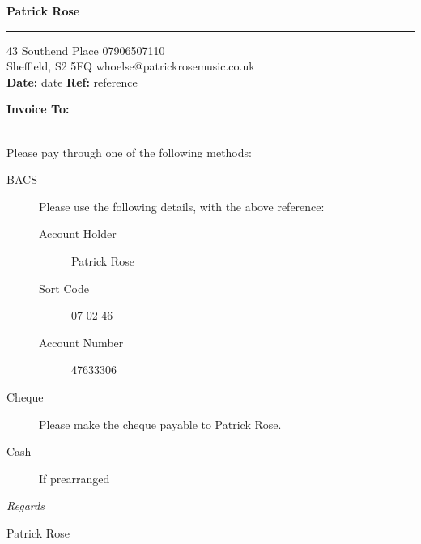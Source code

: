 \documentclass{invoice} %
\def \tab {\hspace*{3ex}} %
\begin{document}

\hfil{\Huge\bf Patrick Rose}\hfil %
\bigskip\break %
\hrule %

43 Southend Place \hfill 07906507110 \\ %
Sheffield, S2 5FQ \hfill whoelse@patrickrosemusic.co.uk\\

\textbf{Date:} {{ date }}  \hfill \textbf{Ref:} {{ reference }}

{\bf Invoice To:} \\
\tab {{ payee }} \\ %



Please pay through one of the following methods:

\begin{description}
\item[BACS] Please use the following details, with the above reference:
  \begin{description}
  \item[Account Holder] Patrick Rose
  \item[Sort Code] 07-02-46
  \item[Account Number] 47633306
  \end{description}
\item[Cheque] Please make the cheque payable to Patrick Rose.
\item[Cash] If prearranged
\end{description}

\textit{Regards}

Patrick Rose
\end{document}
